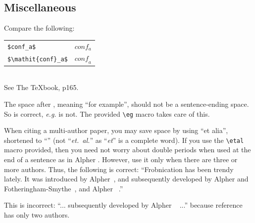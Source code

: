 \subsection{Miscellaneous}

\noindent
Compare the following:\\
\begin{tabular}{ll}
 \verb'$conf_a$' &  $conf_a$ \\
 \verb'$\mathit{conf}_a$' & $\mathit{conf}_a$
\end{tabular}\\
See The \TeX book, p165.

The space after \eg, meaning ``for example'', should not be a sentence-ending space.
So \eg is correct, {\em e.g.} is not.
The provided \verb'\eg' macro takes care of this.

When citing a multi-author paper, you may save space by using ``et alia'', shortened to ``\etal'' (not ``{\em et.\ al.}'' as ``{\em et}'' is a complete word).
If you use the \verb'\etal' macro provided, then you need not worry about double periods when used at the end of a sentence as in Alpher \etal.
However, use it only when there are three or more authors.
Thus, the following is correct:
   ``Frobnication has been trendy lately.
   It was introduced by Alpher~\cite{Alpher02}, and subsequently developed by
   Alpher and Fotheringham-Smythe~\cite{Alpher03}, and Alpher \etal~\cite{Alpher04}.''

This is incorrect: ``... subsequently developed by Alpher \etal~\cite{Alpher03} ...'' because reference~\cite{Alpher03} has only two authors.

